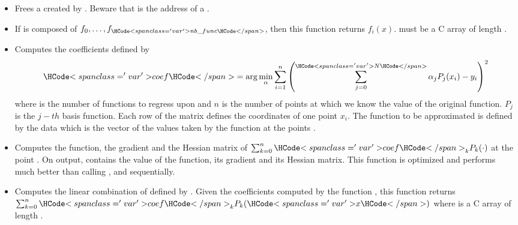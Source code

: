 \begin{itemize}
\item  {}
  \sshortdescribe Frees a  created by
  . Beware that  is the address of a
  \ptr.

\item  {}
  \sshortdescribe If  is composed of $f_0, \dots, f_{\var{nb\_func}}$,
  then this function returns $f_i(x)$.  must be a C array of length
  .

\item {}
  \sshortdescribe Computes the coefficients  defined by
  \begin{equation*}
    \var{coef} = \arg\min_\alpha \sum_{i=1}^n
    \left( \sum_{j=0}^{\var{N}} \alpha_j  P_j(x_i) - y_i\right)^2
  \end{equation*}
  where  is the number of functions to regress upon and $n$ is the
  number of points at which we know the value of the original function. $P_j$
  is the $j-th$ basis function. Each row of the matrix  defines the
  coordinates of one point $x_i$. The function to be approximated is defined
  by the data  which is the vector of the values taken by the function
  at the points .

\item {}
  \sshortdescribe Computes the function, the gradient and the Hessian matrix
  of $\sum_{k=0}^n \var{coef}_k  P_k(\cdot)$ at the point .
  On output,  contains the value of the function,  its
  gradient and  its Hessian matrix. This function is optimized and
  performs much better than calling ,
   and  sequentially.

\item {}
  \sshortdescribe Computes the linear combination of  defined by
  . Given the coefficients computed by the function
  , this function returns $\sum_{k=0}^n
  \var{coef}_k  P_k(\var{x})$ where  is a C array of length
  .


\end{itemize}

